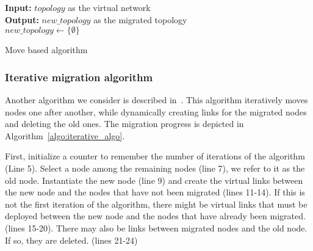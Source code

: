 \begin{algorithm}[ht]
\textbf{Input: }$topology$ as the virtual network\\
\textbf{Output: } $new\_topology$ as the migrated topology\\
$new\_topology \gets \{\emptyset\}$\\
\caption{Move based algorithm}
\label{algo:move_algo}
\end{algorithm}


\subsubsection{Iterative migration algorithm}
Another algorithm we consider is described in~\cite{vnm-lo2013}.
This algorithm iteratively moves nodes one after another, while dynamically creating links for the migrated nodes and deleting the old ones.
The migration progress is depicted in Algorithm~\ref{algo:iterative_algo}.

First, initialize a counter to remember the number of iterations of the algorithm (Line 5).
Select a node among the remaining nodes (line 7), we refer to it as the old node. Instantiate the new node (line 9) and create the virtual links between the new node and the nodes that have not been migrated (lines 11-14).
If this is not the first iteration of the algorithm, there might be virtual links that must be deployed between the new node and the nodes that have already been migrated. (lines 15-20).
There may also be links between migrated nodes and the old node.
If so, they are deleted. (lines 21-24)



